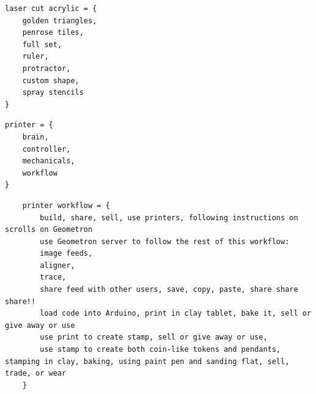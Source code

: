 \begin{verbatim}
laser cut acrylic = {
    golden triangles, 
    penrose tiles, 
    full set, 
    ruler,
    protractor,
    custom shape,
    spray stencils
}
\end{verbatim}

\begin{verbatim}
printer = {
    brain,
    controller,
    mechanicals,
    workflow
}
\end{verbatim}

\begin{verbatim}
    printer workflow = {
        build, share, sell, use printers, following instructions on scrolls on Geometron
        use Geometron server to follow the rest of this workflow: 
        image feeds,
        aligner,
        trace,
        share feed with other users, save, copy, paste, share share share!!
        load code into Arduino, print in clay tablet, bake it, sell or give away or use
        use print to create stamp, sell or give away or use,
        use stamp to create both coin-like tokens and pendants, stamping in clay, baking, using paint pen and sanding flat, sell, trade, or wear
    }
\end{verbatim}
    